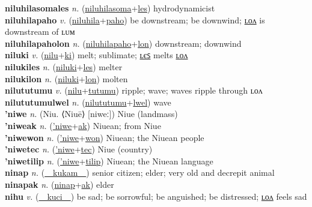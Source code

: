\textbf{niluhilasomales} \textit{n.} (\hyperref[niluhilasoma]{niluhilasoma}+\hyperref[les]{les})
hydrodynamicist \label{niluhilasomales} \\
\textbf{niluhilapaho} \textit{v.} (\hyperref[niluhila]{niluhila}+\hyperref[paho]{paho})
be downstream; be downwind; \hyperref[niluhilapaholon]{ʟᴏᴧ} is downstream of ʟᴜᴍ \label{niluhilapaho} \\
\textbf{niluhilapaholon} \textit{n.} (\hyperref[niluhilapaho]{niluhilapaho}+\hyperref[lon]{lon})
downstream; downwind \label{niluhilapaholon} \\
\textbf{niluki} \textit{v.} (\hyperref[nilu]{nilu}+\hyperref[ki]{ki})
melt; sublimate; \hyperref[nilukiles]{ʟєꜱ} melts \hyperref[nilukilon]{ʟᴏᴧ} \label{niluki} \\
\textbf{nilukiles} \textit{n.} (\hyperref[niluki]{niluki}+\hyperref[les]{les})
melter \label{nilukiles} \\
\textbf{nilukilon} \textit{n.} (\hyperref[niluki]{niluki}+\hyperref[lon]{lon})
molten \label{nilukilon} \\
\textbf{nilututumu} \textit{v.} (\hyperref[nilu]{nilu}+\hyperref[tutumu]{tutumu})
ripple; wave; waves ripple through ʟᴏᴧ \label{nilututumu} \\
\textbf{nilututumulwel} \textit{n.} (\hyperref[nilututumu]{nilututumu}+\hyperref[lwel]{lwel})
wave \label{nilututumulwel} \\
\textbf{'niwe} \textit{n.} (Niu. ⟨Niuē⟩ [niweː])
Niue (landmass) \label{'niwe} \\
\textbf{'niweak} \textit{n.} (\hyperref['niwe]{'niwe}+\hyperref[ak]{ak})
Niuean; from Niue \label{'niweak} \\
\textbf{'niwewon} \textit{n.} (\hyperref['niwe]{'niwe}+\hyperref[won]{won})
Niuean; the Niuean people \label{'niwewon} \\
\textbf{'niwetec} \textit{n.} (\hyperref['niwe]{'niwe}+\hyperref[tec]{tec})
Niue (country) \label{'niwetec} \\
\textbf{'niwetilip} \textit{n.} (\hyperref['niwe]{'niwe}+\hyperref[tilip]{tilip})
Niuean; the Niuean language \label{'niwetilip} \\
\textbf{ninap} \textit{n.} (\hyperref[kukam]{~~kukam~~})
senior citizen; elder; very old and decrepit animal \label{ninap} \\
\textbf{ninapak} \textit{n.} (\hyperref[ninap]{ninap}+\hyperref[ak]{ak})
elder \label{ninapak} \\
\textbf{nihu} \textit{v.} (\hyperref[kuci]{~~kuci~~})
be sad; be sorrowful; be anguished; be distressed; \hyperref[nihulon]{ʟᴏᴧ} feels sad \label{nihu} \\
